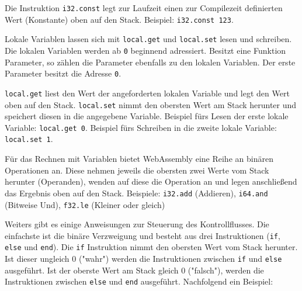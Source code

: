 Die Instruktion \lstinline{i32.const} legt zur Laufzeit einen zur Compilezeit definierten Wert (Konstante) oben auf den Stack. Beispiel: \lstinline{i32.const 123}.

Lokale Variablen lassen sich mit \lstinline{local.get} und \lstinline{local.set} lesen und schreiben. Die lokalen Variablen werden ab \lstinline{0} beginnend adressiert. Besitzt eine Funktion Parameter, so zählen die Parameter ebenfalls zu den lokalen Variablen. Der erste Parameter besitzt die Adresse \lstinline{0}.

\lstinline{local.get} liest den Wert der angeforderten lokalen Variable und legt den Wert oben auf den Stack. \lstinline{local.set} nimmt den obersten Wert am Stack herunter und speichert diesen in die angegebene Variable. Beispiel fürs Lesen der erste lokale Variable: \lstinline{local.get 0}. Beispiel fürs Schreiben in die zweite lokale Variable: \lstinline{local.set 1}.

Für das Rechnen mit Variablen bietet WebAssembly eine Reihe an binären Operationen an. Diese nehmen jeweils die obersten zwei Werte vom Stack herunter (Operanden), wenden auf diese die Operation an und legen anschließend das Ergebnis oben auf den Stack. Beispiele: \lstinline{i32.add} (Addieren), \lstinline{i64.and} (Bitweise Und), \lstinline{f32.le} (Kleiner oder gleich)

Weiters gibt es einige Anweisungen zur Steuerung des Kontrollflusses. Die einfachste ist die binäre Verzweigung und besteht aus drei Instruktionen (\lstinline{if}, \lstinline{else} und \lstinline{end}). Die \lstinline{if} Instruktion nimmt den obersten Wert vom Stack herunter. Ist dieser ungleich 0 ("wahr") werden die Instruktionen zwischen \lstinline{if} und \lstinline{else} ausgeführt. Ist der oberste Wert am Stack gleich 0 ("falsch"), werden die Instruktionen zwischen \lstinline{else} und \lstinline{end} ausgeführt. Nachfolgend ein Beispiel:



